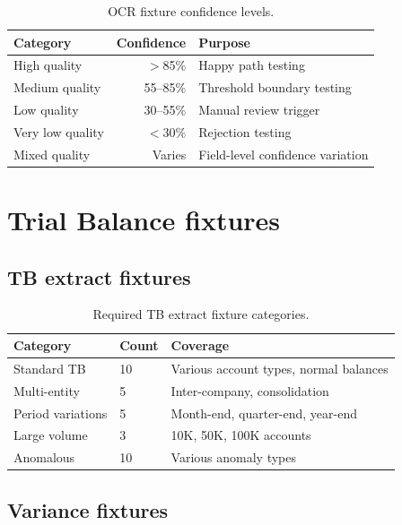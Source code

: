 \begin{table}[htbp]
\centering
\caption{OCR fixture confidence levels.}
\label{tab:ocr-fixtures}
\footnotesize
\begin{tabularx}{\linewidth}{@{}l r X@{}}
\toprule
\textbf{Category} & \textbf{Confidence} & \textbf{Purpose} \\ \midrule
High quality & $>$85\% & Happy path testing \\
Medium quality & 55--85\% & Threshold boundary testing \\
Low quality & 30--55\% & Manual review trigger \\
Very low quality & $<$30\% & Rejection testing \\
Mixed quality & Varies & Field-level confidence variation \\
\bottomrule
\end{tabularx}
\end{table}

\section{Trial Balance fixtures}

\subsection{TB extract fixtures}

\begin{table}[htbp]
\centering
\caption{Required TB extract fixture categories.}
\label{tab:tb-fixtures}
\footnotesize
\begin{tabularx}{\linewidth}{@{}l l X@{}}
\toprule
\textbf{Category} & \textbf{Count} & \textbf{Coverage} \\ \midrule
Standard TB & 10 & Various account types, normal balances \\
Multi-entity & 5 & Inter-company, consolidation \\
Period variations & 5 & Month-end, quarter-end, year-end \\
Large volume & 3 & 10K, 50K, 100K accounts \\
Anomalous & 10 & Various anomaly types \\
\bottomrule
\end{tabularx}
\end{table}

\subsection{Variance fixtures}

